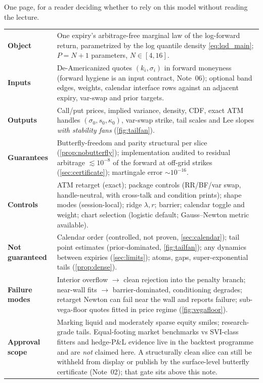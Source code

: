 \documentclass[11pt]{article}
\begin{document}
One page, for a reader deciding whether to rely on this model without
reading the lecture.

\begingroup
\small
\setlength{\tabcolsep}{4pt}
\renewcommand{\arraystretch}{1.2}
\begin{tabular}{@{}p{}p{}@{}}
\toprule
\textbf{Object} & One expiry's arbitrage-free marginal law of the
log-forward return, parametrized by the log quantile density
\eqref{eq:lqd_main}; $P=N+1$ parameters, $N\in[4,16]$.\\
\textbf{Inputs} & De-Americanized quotes $(k_i,\sigma_i)$ in forward
moneyness (forward hygiene is an input contract, Note~06); optional band
edges, weights, calendar interface rows against an adjacent expiry,
var-swap and prior targets.\\
\textbf{Outputs} & Call/put prices, implied variance, density, CDF, exact
ATM handles $(\sigma_0,s_0,\kappa_0)$, var-swap strike, tail scales and Lee
slopes \emph{with stability fans} (\cref{fig:tailfan}).\\
\textbf{Guarantees} & Butterfly-freedom and parity structural per slice
(\cref{prop:nobutterfly}); implementation audited to residual arbitrage
$\lesssim10^{-8}$ of the forward at off-grid strikes
(\cref{sec:certificate}); martingale error $\sim10^{-16}$.\\
\textbf{Controls} & ATM retarget (exact); package controls (RR/BF/var swap,
handle-neutral, with cross-talk and condition prints); shape modes
(session-local); ridge $\lambda,r$; barrier; calendar toggle and weight;
chart selection (logistic default; Gauss--Newton metric available).\\
\textbf{Not guaranteed} & Calendar order (controlled, not proven,
\cref{sec:calendar}); tail point estimates (prior-dominated,
\cref{fig:tailfan}); any dynamics between expiries (\cref{sec:limits});
atoms, gaps, super-exponential tails (\cref{prop:dense}).\\
\textbf{Failure modes} & Interior overflow $\to$ clean rejection into the
penalty branch; near-wall fits $\to$ barrier-dominated, conditioning
degrades; retarget Newton can fail near the wall and reports failure;
sub-vega-floor quotes fitted in price regime (\cref{fig:vegafloor}).\\
\textbf{Approval scope} & Marking liquid and moderately sparse equity
smiles; research-grade tails.  Equal-footing market benchmarks vs
SVI-class fitters and hedge-P\&L evidence live in the backtest programme
and are \emph{not} claimed here.  A structurally clean slice can still be
withheld from display or publish by the surface-level butterfly
certificate (Note~02); that gate sits above this note.\\
\bottomrule
\end{tabular}
\endgroup
\end{document}
